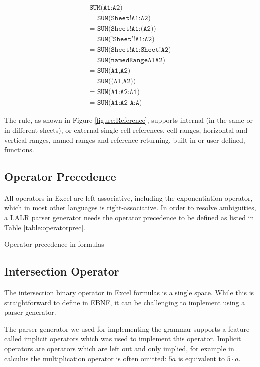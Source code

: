 \documentclass[times]{smrauth}
\begin{document}
\begin{align}
	\texttt{SUM(A1:A2)} \\ 
	\texttt{= SUM(Sheet!A1:A2)} \\
	\texttt{= SUM(Sheet!A1:(A2))} \\
	\texttt{= SUM('Sheet'!A1:A2)} \\
	\texttt{= SUM(Sheet!A1:Sheet!A2)} \\
	\texttt{= SUM(namedRangeA1A2)} \\ 
	\texttt{= SUM(A1,A2)} \\ 
	\texttt{= SUM((A1,A2))} \\ 
	\texttt{= SUM(A1:A2:A1)} \\
	\texttt{= SUM(A1:A2 A:A)} 
\end{align}

The  rule, as shown in Figure \ref{figure:Reference}, supports internal (in the same or in different sheets), or external single cell references, cell ranges, horizontal and vertical ranges, named ranges and reference-returning, built-in or user-defined, functions.

\subsection{Operator Precedence}
\label{sec:operatorprecedence}

All operators in Excel are left-associative, including the exponentiation operator, which in most other languages is right-associative.
In order to resolve ambiguities, a LALR parser generator needs the operator precedence to be defined as listed in Table \ref{table:operatorprec}.

\begin{table}[]
	\centering
	\caption{Operator precedence in formulas}
	\label{table:operatorprec}
	
\end{table}

\subsection{Intersection Operator}
\label{sec:intersection}
The intersection binary operator in Excel formulas is a single space.
While this is straightforward to define in EBNF, it can be challenging to implement using a parser generator.

The parser generator we used for implementing the grammar supports a feature called implicit operators which was used to implement this operator.
Implicit operators are operators which are left out and only implied, for example in calculus the multiplication operator is often omitted: $5a$ is equivalent to $5 \cdot a$.
\end{document}
